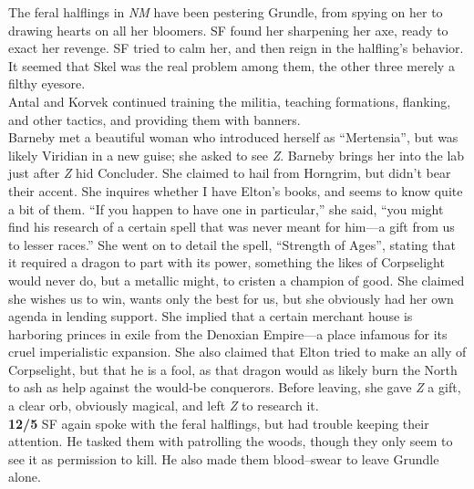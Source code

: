 \documentclass[letterpaper]{article}
\begin{document}
\noindent The feral halflings in \emph{NM} have been pestering Grundle, from spying on her to drawing hearts on all her bloomers. SF found her sharpening her axe, ready to exact her revenge.  SF tried to calm her, and then reign in the halfling's behavior.  It seemed that Skel was the real problem among them, the other three merely a filthy eyesore.  \\

\noindent Antal and Korvek continued training the militia, teaching formations, flanking, and other tactics, and providing them with banners.\\

\noindent Barneby met a beautiful woman who introduced herself as ``Mertensia'', but was likely Viridian in a new guise; she asked to see \emph{Z}. Barneby brings her into the lab just after \emph{Z} hid Concluder.  She claimed to hail from Horngrim, but didn't bear their accent.  She inquires whether I have Elton's books, and seems to know quite a bit of them.  ``If you happen to have one in particular,'' she said, ``you might find his research of a certain spell that was never meant for him---a gift from us to lesser races.'' She went on to detail the spell, ``Strength of Ages'', stating that it required a dragon to part with its power, something the likes of Corpselight would never do, but a metallic might, to cristen a champion of good.  She claimed she wishes us to win, wants only the best for us, but she obviously had her own agenda in lending support.  She implied that a certain merchant house is harboring princes in exile from the Denoxian Empire---a place infamous for its cruel imperialistic expansion.  She also claimed that Elton tried to make an ally of Corpselight, but that he is a fool, as that dragon would as likely burn the North to ash as help against the would-be conquerors. Before leaving, she gave \emph{Z} a gift, a clear orb, obviously magical, and left \emph{Z} to research it.\\

\noindent\textbf{12/5} SF again spoke with the feral halflings, but had trouble keeping their attention.  He tasked them with patrolling the woods, though they only seem to see it as permission to kill. He also made them blood--swear to leave Grundle alone.\\
\end{document}
